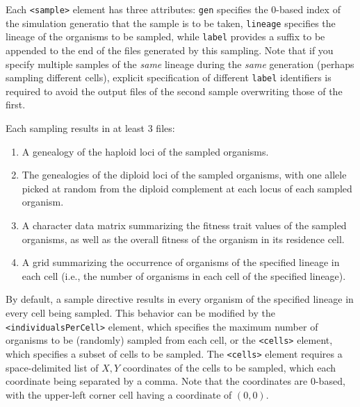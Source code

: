 \documentclass[11pt]{article}
\newcommand{\xmlelem}[1]{{\tt<\textcolor{xmlelem}{#1}>}}
\newcommand{\xmlattr}[1]{{\tt\textcolor{xmlattr}{#1}}}
\begin{document}
Each \xmlelem{sample} element has three attributes: \xmlattr{gen} specifies the 0-based index of the simulation generatio that the sample is to be taken, \xmlattr{lineage} specifies the lineage of the organisms to be sampled, while \xmlattr{label} provides a suffix to be appended to the end of the files generated by this sampling.
Note that if you specify multiple samples of the \textit{same} lineage during the \textit{same} generation (perhaps sampling different cells), explicit specification of different \xmlattr{label} identifiers is required to avoid the output files of the second sample overwriting those of the first.

Each sampling results in at least 3 files:
\begin{enumerate}
	\item A genealogy of the haploid loci of the sampled organisms.
	\item The genealogies of the diploid loci of the sampled organisms, with one allele picked at random from the diploid complement at each locus of each sampled organism.
	\item A character data matrix summarizing the fitness trait values of the sampled organisms, as well as the overall fitness of the organism in its residence cell.
	\item A grid summarizing the occurrence of organisms of the specified lineage in each cell (i.e., the number of organisms in each cell of the specified lineage).
\end{enumerate}

By default, a sample directive results in every organism of the specified lineage in every cell being sampled.
This behavior can be modified by the \xmlelem{individualsPerCell} element, which specifies the maximum number of organisms to be (randomly) sampled from each cell, or the \xmlelem{cells} element, which specifies a subset of cells to be sampled.
The \xmlelem{cells} element requires a space-delimited list of $X,Y$ coordinates of the cells to be sampled, which each coordinate being separated by a comma. Note that the coordinates are 0-based, with the upper-left corner cell having a coordinate of $(0,0)$.
\end{document}
